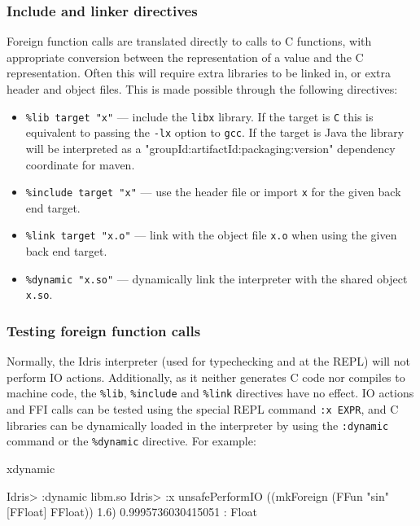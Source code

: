 \subsubsection*{Include and linker directives}

Foreign function calls are translated directly to calls to C functions, with appropriate
conversion between the \Idris{} representation of a value and the C representation.
Often this will require extra libraries to be linked in, or extra header and object files.
This is made possible through the following directives:

\begin{itemize}
\item \texttt{\%lib target "x"} --- include the \texttt{libx} library. If the target is \texttt{C} this is equivalent to passing the
\texttt{-lx} option to \texttt{gcc}. If the target is Java the library will be interpreted as a 
"groupId:artifactId:packaging:version" dependency coordinate for maven.
\item \texttt{\%include target "x"} --- use the header file or import \texttt{x} for the given back end target.
\item \texttt{\%link target "x.o"} --- link with the object file \texttt{x.o} when using the given back end target.
\item \texttt{\%dynamic "x.so"} --- dynamically link the interpreter with the shared object \texttt{x.so}.
\end{itemize}

\subsubsection*{Testing foreign function calls}
Normally, the Idris interpreter (used for typechecking and at the REPL) will
not perform IO actions.  Additionally, as it neither generates C code nor
compiles to machine code, the \texttt{\%lib}, \texttt{\%include} and
\texttt{\%link} directives have no effect. IO actions and FFI calls can be
tested using the special REPL command \texttt{:x EXPR}, and C libraries can be
dynamically loaded in the interpreter by using the \texttt{:dynamic} command
or the \texttt{\%dynamic} directive. For example:

\begin{SaveVerbatim}{xdynamic}

Idris> :dynamic libm.so
Idris> :x unsafePerformIO ((mkForeign (FFun "sin" [FFloat] FFloat)) 1.6)
0.9995736030415051 : Float

\end{SaveVerbatim}

